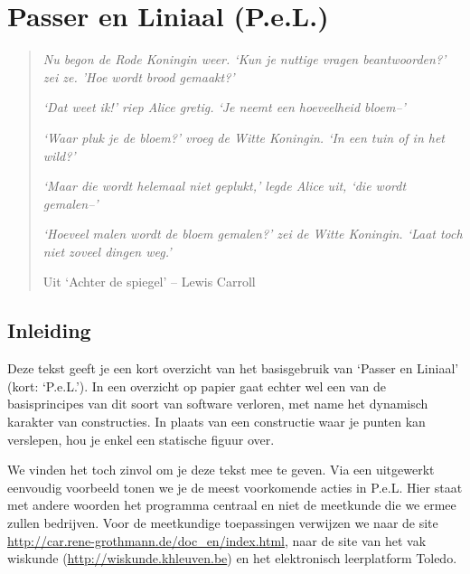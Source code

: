 %
%
%
%

\chapter{Passer en Liniaal (P.e.L.)}
\begin{quote}
     \textit{{\small Nu begon de Rode Koningin weer. `Kun je nuttige
     vragen beantwoorden?' zei ze. 'Hoe wordt brood gemaakt?'}}

     \textit{{\small `\emph{Dat} weet ik!' riep Alice gretig. `Je
     neemt een hoeveelheid bloem--'}}

     \textit{{\small `Waar pluk je de bloem?' vroeg de Witte Koningin.
     `In een tuin of in het wild?'}}

     \textit{{\small `Maar die wordt helemaal niet \emph{geplukt},'
     legde Alice uit, `die wordt \emph{gemalen}--'}}

     \textit{{\small `Hoeveel malen wordt de bloem gemalen?' zei de
     Witte Koningin. `Laat toch niet zoveel dingen weg.'}}

          Uit `Achter de spiegel' -- Lewis Carroll
\end{quote}

\newpage
\section{Inleiding}
Deze tekst geeft je een kort overzicht van het basisgebruik van `Passer en Liniaal' (kort: `P.e.L.'). In een overzicht op papier gaat echter wel een van de basisprincipes van dit soort van software verloren, met name het dynamisch karakter van constructies. In plaats van een constructie waar je punten kan verslepen, hou je enkel een statische figuur over.

We vinden het toch zinvol om je deze tekst mee te geven. Via een uitgewerkt eenvoudig voorbeeld tonen we je de meest voorkomende acties in P.e.L. Hier staat met andere woorden het  programma centraal en niet de meetkunde die we ermee zullen bedrijven. Voor de meetkundige toepassingen verwijzen we naar de site \url{http://car.rene-grothmann.de/doc_en/index.html}, naar de site van het vak wiskunde (\url{http://wiskunde.khleuven.be}) en het elektronisch leerplatform Toledo.

